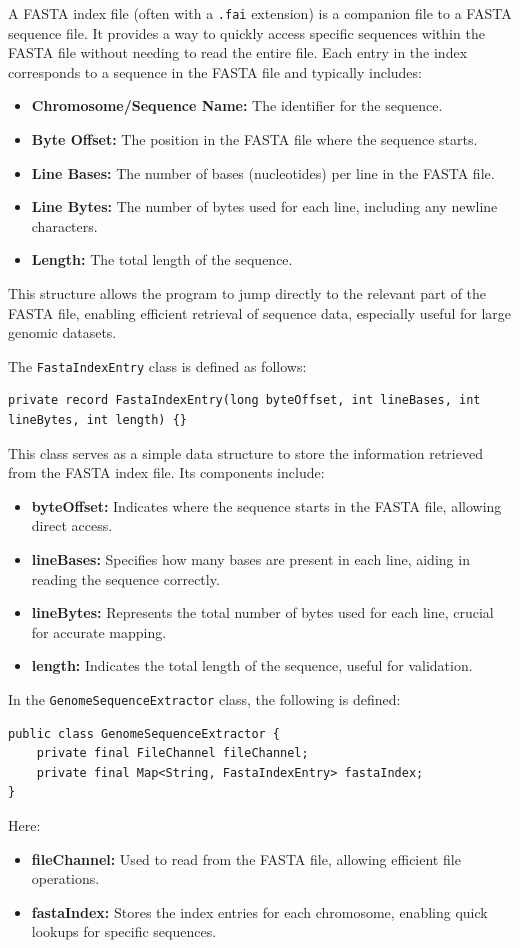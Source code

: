 \documentclass{article}
\begin{document}
    A FASTA index file (often with a \texttt{.fai} extension) is a companion file to a FASTA sequence file. It provides a way to quickly access specific sequences within the FASTA file without needing to read the entire file. Each entry in the index corresponds to a sequence in the FASTA file and typically includes:
    \begin{itemize}
        \item \textbf{Chromosome/Sequence Name:} The identifier for the sequence.
        \item \textbf{Byte Offset:} The position in the FASTA file where the sequence starts.
        \item \textbf{Line Bases:} The number of bases (nucleotides) per line in the FASTA file.
        \item \textbf{Line Bytes:} The number of bytes used for each line, including any newline characters.
        \item \textbf{Length:} The total length of the sequence.
    \end{itemize}
    This structure allows the program to jump directly to the relevant part of the FASTA file, enabling efficient retrieval of sequence data, especially useful for large genomic datasets.

    The \texttt{FastaIndexEntry} class is defined as follows:
    \begin{verbatim}
private record FastaIndexEntry(long byteOffset, int lineBases, int lineBytes, int length) {}
    \end{verbatim}
    This class serves as a simple data structure to store the information retrieved from the FASTA index file. Its components include:
    \begin{itemize}
        \item \textbf{byteOffset:} Indicates where the sequence starts in the FASTA file, allowing direct access.
        \item \textbf{lineBases:} Specifies how many bases are present in each line, aiding in reading the sequence correctly.
        \item \textbf{lineBytes:} Represents the total number of bytes used for each line, crucial for accurate mapping.
        \item \textbf{length:} Indicates the total length of the sequence, useful for validation.
    \end{itemize}

    In the \texttt{GenomeSequenceExtractor} class, the following is defined:
    \begin{verbatim}
public class GenomeSequenceExtractor {
    private final FileChannel fileChannel;
    private final Map<String, FastaIndexEntry> fastaIndex;
}
    \end{verbatim}
    Here:
    \begin{itemize}
        \item \textbf{fileChannel:} Used to read from the FASTA file, allowing efficient file operations.
        \item \textbf{fastaIndex:} Stores the index entries for each chromosome, enabling quick lookups for specific sequences.
    \end{itemize}
\end{document}
